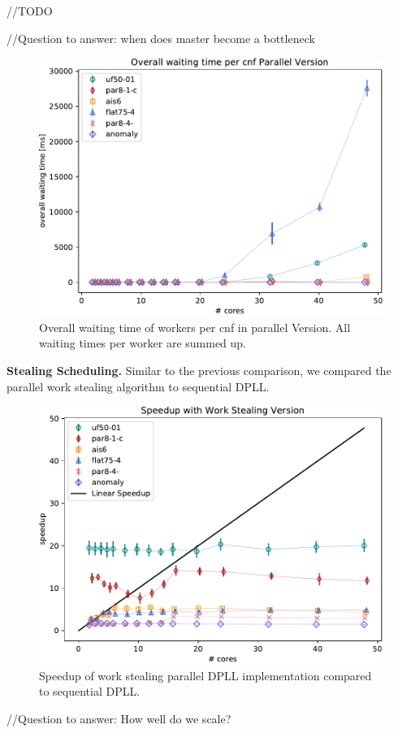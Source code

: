 \documentclass[letterpaper]{article}
\newcommand{\mypar}[1]{{\bf #1.}}
\begin{document}
//TODO

//Question to answer: when does master become a bottleneck
\begin{figure}
    \centering
    \includegraphics[width=\columnwidth]{figures/dpll_waiting_parallel}
    \caption{Overall waiting time of workers per cnf in parallel Version.
    All waiting times per worker are summed up.
    \label{fig:dpll_parallel_waiting}}
\end{figure}

\mypar{Stealing Scheduling}
Similar to the previous comparison, we compared the parallel work stealing algorithm to sequential DPLL.
\begin{figure}
  \centering
  \includegraphics[width=\columnwidth]{figures/dpll_scaling_stealing}
  \caption{Speedup of work stealing parallel DPLL implementation compared to sequential DPLL.
  \label{fig:dpll_stealing_speedup}}
\end{figure}
//Question to answer: How well do we scale?
\end{document}

